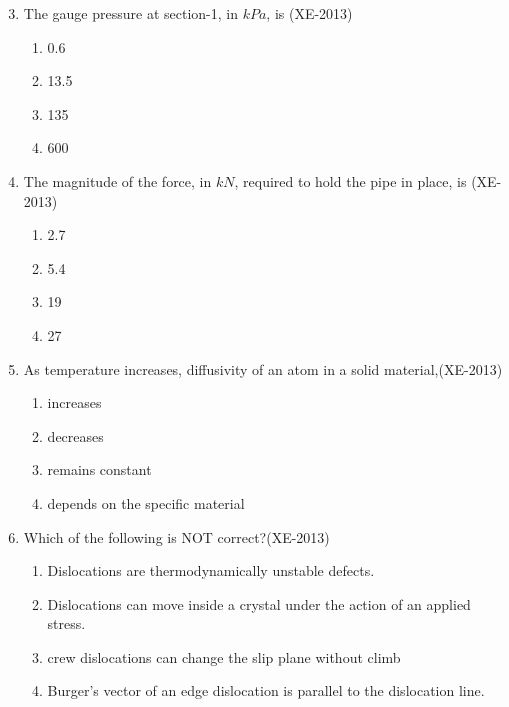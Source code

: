 \documentclass[journal]{IEEEtran}
\numberwithin{equation}{enumi}
\numberwithin{figure}{enumi}
\begin{document}
\begin{enumerate}
    \setcounter{enumi}{2} %
    \item The gauge pressure at section-1, in $kPa$, is \label{47} \hfill(XE-2013)
    \begin{multicols}{4}
        \begin{enumerate}
            \item 0.6
            \item 13.5
            \item 135
            \item 600
        \end{enumerate}
    \end{multicols}

    \item The magnitude of the force, in $kN$, required to hold the pipe in place, is \label{48} \hfill(XE-2013)
    \begin{multicols}{4}
        \begin{enumerate}
            \item 2.7
            \item 5.4
            \item 19
            \item 27
        \end{enumerate}
    \end{multicols}





    

\item As temperature increases, diffusivity of an atom in a solid material,\hfill(XE-2013)
\begin{enumerate}
    \item increases
    \item decreases
    \item remains constant
    \item depends on the specific material
\end{enumerate}
\item Which of the following is NOT correct?\hfill(XE-2013)
\begin{enumerate}
    \item Dislocations are thermodynamically unstable defects.
    \item Dislocations can move inside a crystal under the action of an applied stress.
    \item crew dislocations can change the slip plane without climb
    \item Burger's vector of an edge dislocation is parallel to the dislocation line.
    

\end{enumerate}
\end{enumerate}
\end{document}
